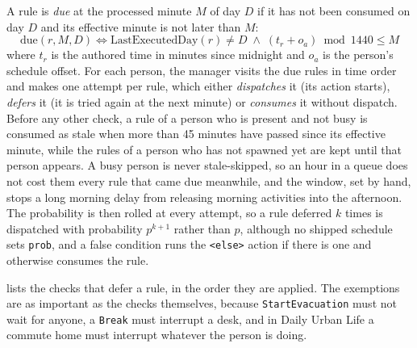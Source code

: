 A rule is \emph{due} at the processed minute $M$ of day $D$ if it has not been consumed on day $D$ and its effective minute is not later than $M$:
\begin{equation}
\boxed{\mathrm{due}(r, M, D) \iff \mathrm{LastExecutedDay}(r) \neq D \;\wedge\; (t_r + o_a) \bmod 1440 \le M}
\label{eq:due}
\end{equation}
where $t_r$ is the authored time in minutes since midnight and $o_a$ is the person's schedule offset. For each person, the manager visits the due rules in time order and makes one attempt per rule, which either \emph{dispatches} it (its action starts), \emph{defers} it (it is tried again at the next minute) or \emph{consumes} it without dispatch. Before any other check, a rule of a person who is present and not busy is consumed as stale when more than 45 minutes have passed since its effective minute, while the rules of a person who has not spawned yet are kept until that person appears. A busy person is never stale-skipped, so an hour in a queue does not cost them every rule that came due meanwhile, and the window, set by hand, stops a long morning delay from releasing morning activities into the afternoon. The probability is then rolled at every attempt, so a rule deferred $k$ times is dispatched with probability $p^{k+1}$ rather than $p$, although no shipped schedule sets \texttt{prob}, and a false condition runs the \texttt{<else>} action if there is one and otherwise consumes the rule.

 lists the checks that defer a rule, in the order they are applied. The exemptions are as important as the checks themselves, because \texttt{StartEvacuation} must not wait for anyone, a \texttt{Break} must interrupt a desk, and in Daily Urban Life a commute home must interrupt whatever the person is doing.

